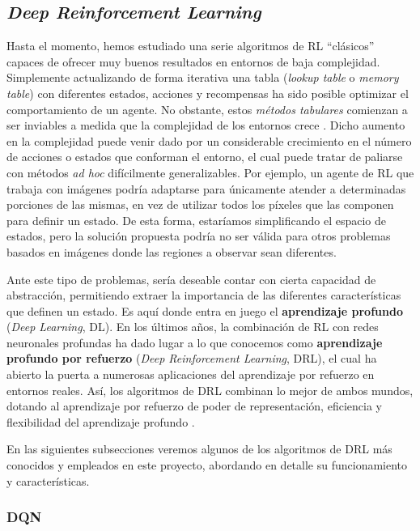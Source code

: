 \subsection{\textit{Deep Reinforcement Learning}}

Hasta el momento, hemos estudiado una serie algoritmos de RL ``clásicos'' capaces de ofrecer muy buenos resultados en entornos de baja complejidad. Simplemente actualizando de forma iterativa una tabla (\textit{lookup table} o \textit{memory table}) con diferentes estados, acciones y recompensas ha sido posible optimizar el comportamiento de un agente. No obstante, estos \textit{métodos tabulares} comienzan a ser inviables a medida que la complejidad de los entornos crece \cite{zai2020deep}. Dicho aumento en la complejidad puede venir dado por un considerable crecimiento en el número de acciones o estados que conforman el entorno, el cual puede tratar de paliarse con métodos \textit{ad hoc} difícilmente generalizables. Por ejemplo, un agente de RL que trabaja con imágenes podría adaptarse para únicamente atender a determinadas porciones de las mismas, en vez de utilizar todos los píxeles que las componen para definir un estado. De esta forma, estaríamos simplificando el espacio de estados, pero la solución propuesta podría no ser válida para otros problemas basados en imágenes donde las regiones a observar sean diferentes.

Ante este tipo de problemas, sería deseable contar con cierta capacidad de abstracción, permitiendo extraer la importancia de las diferentes características que definen un estado. Es aquí donde entra en juego el \textbf{aprendizaje profundo} (\textit{Deep Learning}, DL). En los últimos años, la combinación de RL con redes neuronales profundas ha dado lugar a lo que conocemos como \textbf{aprendizaje profundo por refuerzo} (\textit{Deep Reinforcement Learning}, DRL), el cual ha abierto la puerta a numerosas aplicaciones del aprendizaje por refuerzo en entornos reales. Así, los algoritmos de DRL combinan lo mejor de ambos mundos, dotando al aprendizaje por refuerzo de poder de representación, eficiencia y flexibilidad del aprendizaje profundo \cite{zai2020deep}.

En las siguientes subsecciones veremos algunos de los algoritmos de DRL más conocidos y empleados en este proyecto, abordando en detalle su funcionamiento y características.

\subsubsection{DQN}

